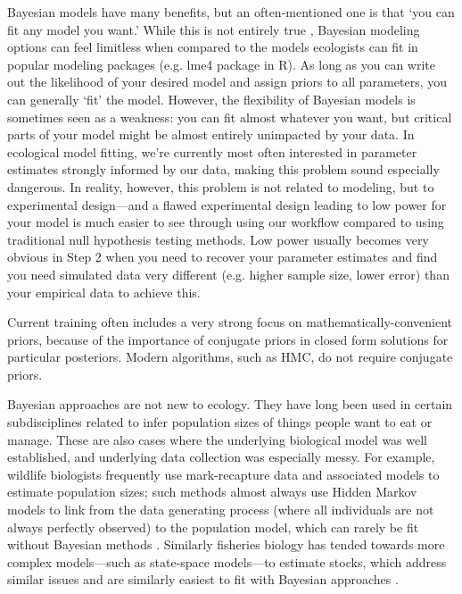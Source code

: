 Bayesian models have many benefits, but an often-mentioned one is that `you can fit any model you want.' While this is not entirely true \citep{BDA,reid2019}, Bayesian modeling options can feel limitless when compared to the models ecologists can fit in popular modeling packages (e.g. \textsf{lme4} package in \textsf{R}). As long as you can write out the likelihood of your desired model \citep[and sometimes even if you can't,][]{Sunnaaker2013} and assign priors to all parameters, you can generally `fit' the model. However, the flexibility of Bayesian models is sometimes seen as a weakness: you can fit almost whatever you want, but critical parts of your model might be almost entirely unimpacted by your data. In ecological model fitting, we're currently most often interested in parameter estimates strongly informed by our data, making this problem sound especially dangerous. In reality, however, this problem is not related to modeling, but to experimental design---and a flawed experimental design leading to low power for your model is much easier to see through using our workflow compared to using traditional null hypothesis testing methods. Low power usually becomes very obvious in Step 2 when you need to recover your parameter estimates and find you need simulated data very different (e.g. higher sample size, lower error) than your empirical data to achieve this.

Current training often includes a very strong focus on mathematically-convenient priors, because of the importance of conjugate priors in closed form solutions for particular posteriors. Modern algorithms, such as HMC, do not require conjugate priors. 

Bayesian approaches are not new to ecology. They have long been used in certain subdisciplines related to infer population sizes of things people want to eat or manage. These are also cases where the underlying biological model was well established, and underlying data collection was especially messy. For example, wildlife biologists frequently use mark-recapture data and associated models to estimate population sizes; such methods almost always use Hidden Markov models to link from the data generating process (where all individuals are not always perfectly observed) to the population model, which can rarely be fit without Bayesian methods \citep{muthuku2008,zheng2007,strinella2020potential}. Similarly fisheries biology has tended towards more complex models---such as state-space models---to estimate stocks, which address similar issues and are similarly easiest to fit with Bayesian approaches \citep{trijoulet2018,millar2000}. %

